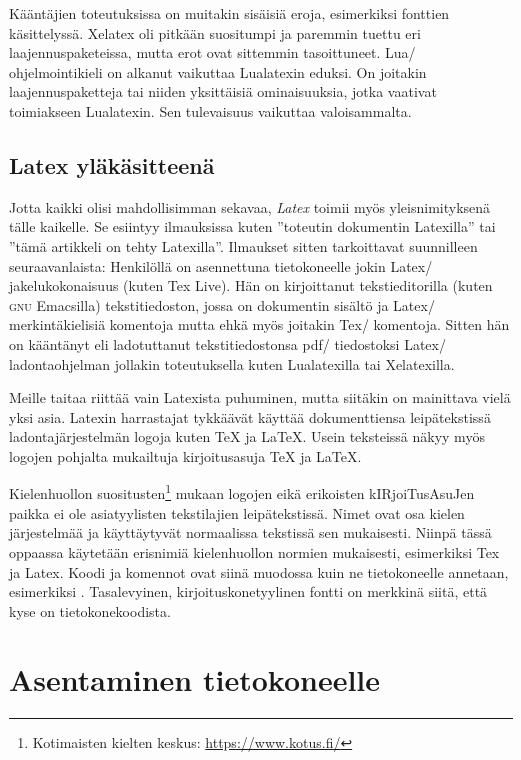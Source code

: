 Kääntäjien toteutuksissa on muitakin sisäisiä eroja, esimerkiksi
fonttien käsittelyssä. Xelatex oli pitkään suositumpi ja paremmin tuettu
eri laajennuspaketeissa, mutta erot ovat sittemmin tasoittuneet. Lua\-/
ohjelmointikieli on alkanut vaikuttaa Lualatexin eduksi. On joitakin
laajennuspaketteja tai niiden yksittäisiä ominaisuuksia, jotka vaativat
toimiakseen Lualatexin. Sen tulevaisuus vaikuttaa valoisammalta.

\subsection{Latex yläkäsitteenä}

Jotta kaikki olisi mahdollisimman sekavaa, \emph{Latex} toimii myös
yleisnimityksenä tälle kaikelle. Se esiintyy ilmauksissa kuten
''toteutin dokumentin Latexilla'' tai ''tämä artikkeli on tehty
Latexilla''. Ilmaukset sitten tarkoittavat suunnilleen seuraavanlaista:
Henkilöllä on asennettuna tietokoneelle jokin Latex\-/ jakelukokonaisuus
(kuten Tex Live). Hän on kirjoittanut tekstieditorilla (kuten
\textsc{gnu} Emacsilla) tekstitiedoston, jossa on dokumentin sisältö ja
Latex\-/ merkintäkielisiä komentoja mutta ehkä myös joitakin Tex\-/
komentoja. Sitten hän on kääntänyt eli ladotuttanut tekstitiedostonsa
pdf\-/ tiedostoksi Latex\-/ ladontaohjelman jollakin toteutuksella kuten
Lualatexilla tai Xelatexilla.

Meille taitaa riittää vain Latexista puhuminen, mutta siitäkin on
mainittava vielä yksi asia. Latexin harrastajat tykkäävät käyttää
dokumenttiensa leipätekstissä ladontajärjestelmän logoja kuten \TeX{} ja
\LaTeX{}. Usein teksteissä näkyy myös logojen pohjalta mukailtuja
kirjoitusasuja TeX ja LaTeX.

Kielenhuollon suositusten\footnote{Kotimaisten kielten keskus:
  \url{https://www.kotus.fi/}} mukaan logojen eikä erikoisten
kIRjoiTusAsuJen paikka ei ole asiatyylisten tekstilajien leipätekstissä.
Nimet ovat osa kielen järjestelmää ja käyttäytyvät normaalissa tekstissä
sen mukaisesti. Niinpä tässä oppaassa käytetään erisnimiä kielenhuollon
normien mukaisesti, esimerkiksi Tex ja Latex. Koodi ja komennot ovat
siinä muodossa kuin ne tietokoneelle annetaan, esimerkiksi
. Tasalevyinen, kirjoituskonetyylinen fontti on merkkinä
siitä, että kyse on tietokonekoodista.

\section{Asentaminen tietokoneelle}
\label{luku/asentaminen}

